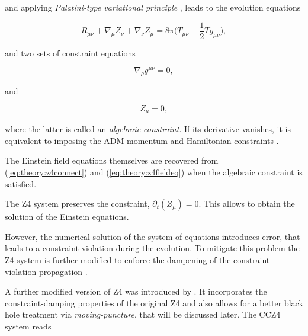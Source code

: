 and applying \textit{Palatini-type variational principle} \cite{Bona:2010is}, leads to the evolution equations

\begin{equation}
R_{\mu\nu} + \nabla_{\mu}Z_{\nu} + \nabla_{\nu}Z_{\mu}=8\pi\Big(T_{\mu\nu} - \frac{1}{2}Tg_{\mu\nu}\Big),
\label{eq:theory:z4fieldeq}
\end{equation}

and two sets of constraint equations

\begin{equation}
\nabla_{\rho} g^{\mu\nu} = 0, 
\label{eq:theory:z4connect}
\end{equation}

and

\begin{equation}
Z_{\mu} = 0,
\end{equation}

where the latter is called an \textit{algebraic constraint}. 
If its derivative vanishes, it is equivalent to imposing the ADM momentum and Hamiltonian constraints \cite{Bona:2009}. 

The Einstein field equations themselves are recovered from (\ref{eq:theory:z4connect}) and (\ref{eq:theory:z4fieldeq}) when the algebraic constraint is satisfied. 

The Z4 system preserves the constraint, $\partial_t (Z_{\mu})= 0$. 
This allows to obtain the solution of the Einstein equations. 

However, the numerical solution of the system of equations introduces error, that leads to a constraint violation during the evolution. 
To mitigate this problem the Z4 system is further modified to enforce the dampening of the constraint violation propagation \cite{Gundlach:2005eh}.

A further modified version of Z4 was introduced by \cite{Alic:2011gg}. 
It incorporates the constraint-damping properties of the original Z4 and also allows for a better black hole treatment via \textit{moving-puncture}, that will be discussed later. 
The CCZ4 system reads 

